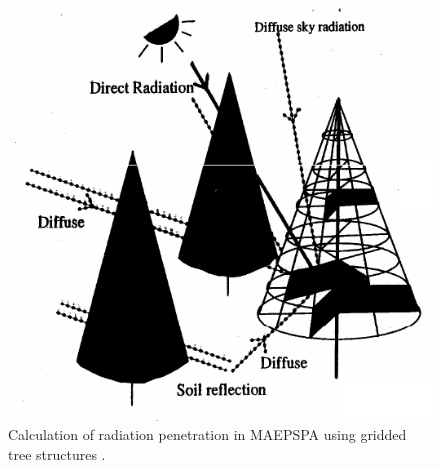 \documentclass[preprint,12pt,authoryear]{elsarticle}
\begin{document}
\begin{figure}[h!] 
    \centering    
    \includegraphics[scale=0.5]{images/Duursma2008-MaespaRadiationGrid.png}
    \caption{Calculation of radiation penetration in MAEPSPA using gridded tree structures \citep{Duursma2008}. \label{fig:maesparadiation}}
\end{figure}


%




%
%
\end{document}
